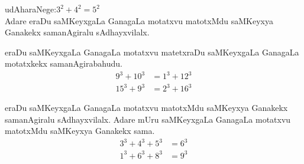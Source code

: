 udAharaNege:\qquad\qquad $3^2+4^2 = 5^2$\\
Adare eraDu saMKeyxgaLa GanagaLa motatxvu matotxMdu saMKeyxya Ganakekx samanAgiralu sAdhayxvilalx.

eraDu saMKeyxgaLa GanagaLa motatxvu matetxraDu saMKeyxgaLa GanagaLa motatxkekx samanAgirabahudu.
\begin{align*}
9^3+10^3 &= 1^3+12^3\\
15^3+9^3 &= 2^3+16^3
\end{align*}

eraDu saMKeyxgaLa GanagaLa motatxvu matotxMdu saMKeyxya Ganakekx samanAgiralu sAdhayxvilalx. Adare mUru saMKeyxgaLa GanagaLa motatxvu matotxMdu saMKeyxya Ganakekx sama.
\begin{align*}
3^3+4^3+5^3 &= 6^3\\
1^3+6^3+8^3 &= 9^3
\end{align*}



